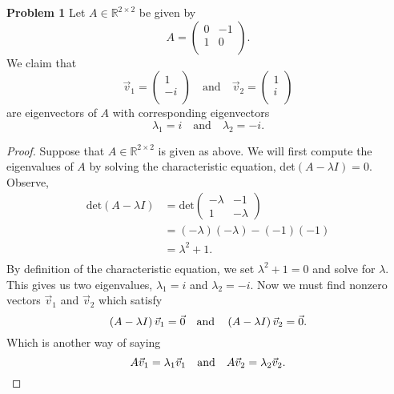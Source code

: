 \documentclass{article}
\begin{document}
\textbf{Problem 1}
Let $A \in \mathbb{R}^{2 \times 2}$ be given by $$A = \begin{pmatrix} 
0 & -1\\
1 & 0\\
\end{pmatrix}.$$ We claim that 
$$\vec{v}_1 = \begin{pmatrix} 
1\\
-i\\
\end{pmatrix} \quad \text{and} \quad \vec{v}_2 = \begin{pmatrix} 
1\\
i\\
\end{pmatrix}$$ are eigenvectors of $A$ with corresponding eigenvectors $$\lambda_1 = i \quad \text{and} \quad \lambda_2 = -i.$$
\begin{proof}
Suppose that $A \in \mathbb{R}^{2\times2}$ is given as above. We will first compute the eigenvalues of $A$ by solving the characteristic equation, det$\left( A - \lambda I \right) = 0.$ Observe,
\begin{align*}
\text{det}\left( A - \lambda I \right) &= \text{det}\begin{pmatrix}-\lambda&-1\\1&-\lambda\end{pmatrix}\\
&= \left(-\lambda\right)\left(-\lambda\right) - \left(-1\right)\left(-1\right)\\
&= \lambda^2 +1.\\
\end{align*}
By definition of the characteristic equation, we set $\lambda^2 + 1 = 0$ and solve for $\lambda$. This gives us two eigenvalues, $\lambda_1 = i$ and $\lambda_2 = -i$. Now we must find nonzero vectors $\vec{v}_1$ and $\vec{v}_2$ which satisfy
\begin{equation}\label{eq1}
\left( A - \lambda I \right)\vec{v}_1 = \vec{0} \quad \text{and} \quad \left( A - \lambda I \right)\vec{v}_2 = \vec{0}.\\
\end{equation}
Which is another way of saying
\begin{equation}\label{eq2}
A\vec{v}_1 = \lambda_1 \vec{v}_1 \quad \text{and} \quad A\vec{v}_2 = \lambda_2 \vec{v}_2.\\
\end{equation}


\end{proof}
\end{document}
